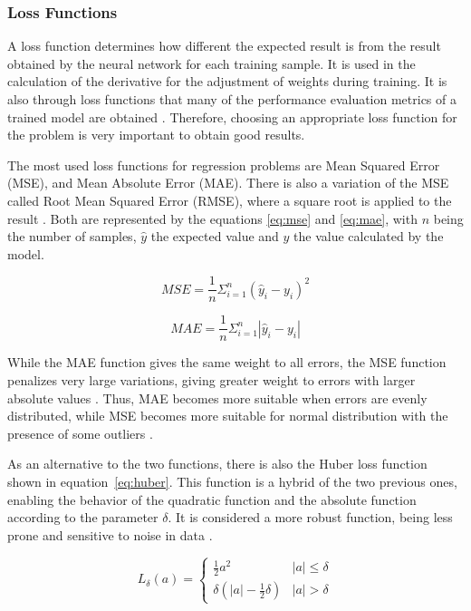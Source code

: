 \documentclass[a4paper,fleqn]{cas-sc}
\begin{document}
\subsubsection{Loss Functions}
A loss function determines how different the expected result is from the result obtained by the neural network for each training sample. It is used in the calculation of the derivative for the adjustment of weights during training. It is also through loss functions that many of the performance evaluation metrics of a trained model are obtained \cite{heaton2015}. Therefore, choosing an appropriate loss function for the problem is very important to obtain good results.

The most used loss functions for regression problems are Mean Squared Error (MSE), and Mean Absolute Error (MAE). There is also a variation of the MSE called Root Mean Squared Error (RMSE), where a square root is applied to the result \cite{chai2014root}. Both are represented by the equations \ref{eq:mse} and \ref{eq:mae}, with $n$ being the number of samples, $\hat{y}$ the expected value and $y$ the value calculated by the model.

\begin{equation}
\label{eq:mse}
MSE = \frac{1}{n}\Sigma_{i=1}^{n}(\hat{y}_i - y_i)^2
\end{equation}

\begin{equation}
\label{eq:mae}
MAE = \frac{1}{n}\Sigma_{i=1}^{n}|\hat{y}_i - y_i|
\end{equation}
 
While the MAE function gives the same weight to all errors, the MSE function penalizes very large variations, giving greater weight to errors with larger absolute values \cite{chai2014root}. Thus, MAE becomes more suitable when errors are evenly distributed, while MSE becomes more suitable for normal distribution with the presence of some outliers \cite{chai2014root}.

As an alternative to the two functions, there is also the Huber loss function shown in equation~\ref{eq:huber}. This function is a hybrid of the two previous ones, enabling the behavior of the quadratic function and the absolute function according to the parameter $\delta$. It is considered a more robust function, being less prone and sensitive to noise in data \cite{Alqahtani2020, Holland1977}.

\begin{equation}
\label{eq:huber}
L_\delta(a) = \left\{\begin{array}{cc}\frac{1}{2}a^2& |a| \leq \delta\\ {}\delta(|a| - \frac{1}{2}\delta) & |a| > \delta\end{array}\right.
\end{equation}
\end{document}
